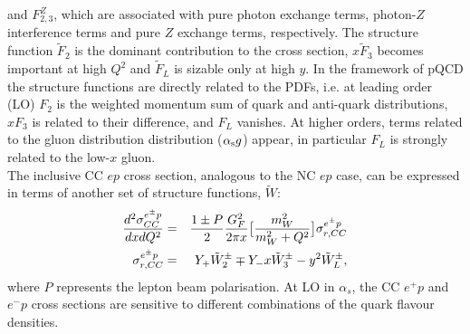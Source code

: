 and $F^Z_{2,3}$, which are associated with pure photon exchange terms, photon-$Z$ interference
terms and pure $Z$ exchange terms, respectively. 
The structure function $\tilde F_2$ is the dominant contribution to the cross section, 
$x \tilde F_3$ becomes important at high $Q^2$ and $\tilde F_L$ is sizable 
only at high $y$. 
In the framework of pQCD the structure functions are directly related to the 
PDFs, i.e. at leading order (LO)  $F_2$ is the weighted momentum sum of quark and anti-quark distributions, 
 $xF_3$ is related to their difference, 
and $F_L$ vanishes. At higher orders, terms related to the gluon distribution distribution
($\alpha_\mathrm{s} g$) appear, in particular $F_L$ is strongly related to the low-$x$ 
gluon.
\\
The inclusive CC $ep$ cross section, analogous to the NC $ep$ case, can be expressed in terms of another set 
of structure functions, $\tilde W$: 
\begin{eqnarray}
\centering
   \frac{d^2\sigma_{CC}^{e^{\pm} p}}{dxdQ^2}&=&\frac{1\pm P}{2}\frac{G^2_F}{2\pi x}\big [\frac{m^2_W}{m^2_W+Q^2}\big ]\sigma_{r,CC}^{e^{\pm} p}\\
   \sigma_{r,CC}^{e^{\pm} p}&= &  Y_{+} \tilde W_2^{\pm} \mp Y_{-}x \tilde W_3^{\pm} - y^2 \tilde W_L^{\pm},
\end{eqnarray}
where $P$ represents the lepton beam polarisation.
At LO in $\alpha_s$, the CC $e^+p$ and $e^-p$ cross sections are sensitive to 
different combinations of the quark flavour densities.

